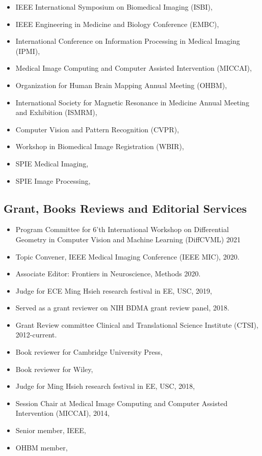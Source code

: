 \documentclass[overlapped,line,letterpaper]{res}
\begin{document}
\begin{resume}
\begin{multicols}{2}
\begin{itemize}
\item IEEE International Symposium on Biomedical Imaging (ISBI),
\item IEEE Engineering in Medicine and Biology Conference (EMBC),
\item International Conference on Information Processing in Medical Imaging (IPMI),
\item Medical Image Computing and Computer Assisted Intervention (MICCAI),
\item Organization for Human Brain Mapping Annual Meeting (OHBM),
\item International Society for Magnetic Resonance in Medicine Annual Meeting and Exhibition (ISMRM),
\item Computer Vision and Pattern Recognition (CVPR),
\item Workshop in Biomedical Image Registration (WBIR),
\item SPIE Medical Imaging,
\item SPIE Image Processing,
\end{itemize}
\end{multicols}

\subsection{Grant, Books Reviews and Editorial Services}
    \begin{itemize}
\item Program Committee for 6'th International Workshop on Differential Geometry in Computer Vision and Machine Learning (DiffCVML) 2021
\item Topic Convener, IEEE Medical Imaging Conference (IEEE MIC), 2020.
\item Associate Editor: Frontiers in Neuroscience, Methods 2020.    
\item Judge for ECE Ming Hsieh research festival in EE, USC, 2019,
\item Served as a grant reviewer on NIH BDMA grant review panel, 2018.
\item Grant Review committee Clinical and Translational Science Institute (CTSI), 2012-current.
\item Book reviewer for Cambridge University Press,
\item Book reviewer for Wiley,
\item Judge for Ming Hsieh research festival in EE, USC, 2018,
\item Session Chair at Medical Image Computing and Computer Assisted Intervention (MICCAI), 2014,
\item Senior member, IEEE, 
\item OHBM member,


\end{itemize}
\end{resume}
\end{document}
